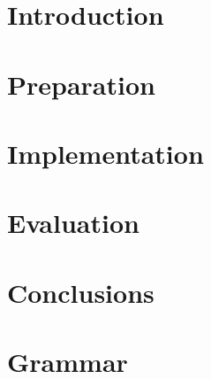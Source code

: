 \documentclass[12pt,a4paper,twoside,openright]{report}
\begin{document}


\chapter{Introduction}


\chapter{Preparation}


\chapter{Implementation}


\chapter{Evaluation}



\chapter{Conclusions}



\newpage

\printbibliography


\appendix


\chapter{Grammar}
\end{document}
